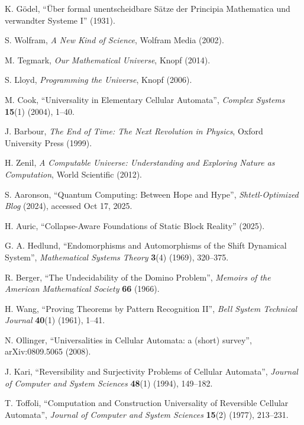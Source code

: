 \documentclass[12pt]{article}
\theoremstyle{plain}
\theoremstyle{definition}
\begin{document}

\begin{thebibliography}{99}

 K. G\"{o}del, ``\"{U}ber formal unentscheidbare S\"{a}tze der Principia Mathematica und verwandter Systeme I'' (1931).

 S. Wolfram, \emph{A New Kind of Science}, Wolfram Media (2002).

 M. Tegmark, \emph{Our Mathematical Universe}, Knopf (2014).

 S. Lloyd, \emph{Programming the Universe}, Knopf (2006).

 M. Cook, ``Universality in Elementary Cellular Automata'', \emph{Complex Systems} \textbf{15}(1) (2004), 1--40.

 J. Barbour, \emph{The End of Time: The Next Revolution in Physics}, Oxford University Press (1999).

 H. Zenil, \emph{A Computable Universe: Understanding and Exploring Nature as Computation}, World Scientific (2012).

 S. Aaronson, ``Quantum Computing: Between Hope and Hype'', \emph{Shtetl-Optimized Blog} (2024), accessed Oct 17, 2025.

 H. Auric, ``Collapse-Aware Foundations of Static Block Reality'' (2025).

 G. A. Hedlund, ``Endomorphisms and Automorphisms of the Shift Dynamical System'', \emph{Mathematical Systems Theory} \textbf{3}(4) (1969), 320--375.

 R. Berger, ``The Undecidability of the Domino Problem'', \emph{Memoirs of the American Mathematical Society} \textbf{66} (1966).

 H. Wang, ``Proving Theorems by Pattern Recognition II'', \emph{Bell System Technical Journal} \textbf{40}(1) (1961), 1--41.

 N. Ollinger, ``Universalities in Cellular Automata: a (short) survey'', arXiv:0809.5065 (2008).

 J. Kari, ``Reversibility and Surjectivity Problems of Cellular Automata'', \emph{Journal of Computer and System Sciences} \textbf{48}(1) (1994), 149--182.

 T. Toffoli, ``Computation and Construction Universality of Reversible Cellular Automata'', \emph{Journal of Computer and System Sciences} \textbf{15}(2) (1977), 213--231.


\end{thebibliography}
\end{document}
